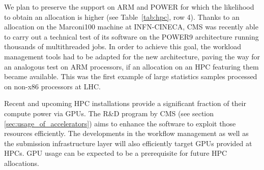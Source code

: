 \documentclass{cmspaper}
\begin{document}
We plan to preserve the support on ARM and POWER for which the likelihood to obtain an allocation is higher (see Table~\ref{tab:hpc}, row 4).
Thanks to an allocation on the Marconi100 machine at INFN-CINECA, CMS was recently able to carry out a technical test of its software on the POWER9 architecture running thousands of multithreaded jobs. In order to achieve this goal, the workload management tools had to be adapted for the new architecture, paving the way for an analogous test on ARM processors, if an allocation on an HPC featuring them became available. This was the first example of large statistics samples processed on non-x86 processors at LHC.

Recent and upcoming HPC installations provide a significant fraction of their compute power via GPUs. The R\&D program by CMS (see section \ref{sec:usage_of_accelerators}) aims to enhance the software to exploit those resources efficiently. The developments in the workflow management as well as the submission infrastructure layer will also efficiently target GPUs provided at HPCs. GPU usage can be expected to be a prerequisite for future HPC allocations.
\end{document}

